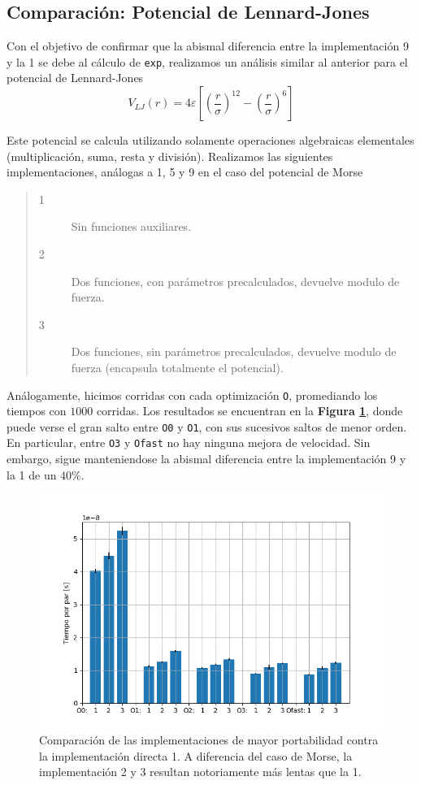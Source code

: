 \documentclass[twoside, 12pt]{article}
\begin{document}
\subsection{Comparación: Potencial de Lennard-Jones}

Con el objetivo de confirmar que la abismal diferencia entre la implementaci\'on 9 y la 1 se debe al c\'alculo de \texttt{exp}, realizamos un an\'alisis similar al anterior para el potencial de Lennard-Jones \[ V_{LJ} (r) =  4\varepsilon \left[ \left(\frac{r}{\sigma}\right)^{12} -\left(\frac{r}{\sigma}\right)^{6} \right] \]

Este potencial se calcula utilizando solamente operaciones algebraicas elementales (multiplicaci\'on, suma, resta y divisi\'on). Realizamos las siguientes implementaciones, an\'alogas a 1, 5 y 9 en el caso del potencial de Morse
	
\begin{quote}
\begin{description}
\item[1] Sin funciones auxiliares.
\item[2] Dos funciones, con parámetros precalculados, devuelve modulo de fuerza.
\item[3] Dos funciones, sin parámetros precalculados, devuelve modulo de fuerza (encapsula totalmente el potencial).
\end{description}
\end{quote}

An\'alogamente, hicimos corridas con cada optimización \texttt{O}, promediando los tiempos con $1000$ corridas. Los resultados se encuentran en la \textbf{Figura \ref{fig:CompEsp_LJ}}, donde puede verse el gran salto entre \texttt{O0} y \texttt{O1}, con sus sucesivos saltos de menor orden. En particular, entre \texttt{O3} y \texttt{Ofast} no hay ninguna mejora de velocidad. Sin embargo, sigue manteniendose la abismal diferencia entre la implementaci\'on 9 y la 1 de un $40\%$.

\begin{figure}[h]
	\centering
	\includegraphics[trim = 10mm 5mm 10mm 5mm, clip, width=0.6\columnwidth]{Comp_tiempos_LJ.png}
	\caption{Comparaci\'on de las implementaciones de mayor portabilidad contra la implementaci\'on directa 1. A diferencia del caso de Morse, la implementaci\'on 2 y 3 resultan notoriamente m\'as lentas que la 1.}
	\label{fig:CompEsp_LJ}
\end{figure}
\end{document}
